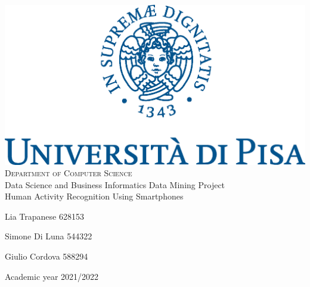 \setlength{\topmargin}{-1cm}
\setlength{\textheight}{240mm}
\setlength{\textwidth}{142mm}
\setlength{\evensidemargin}{0.3in}
\setlength{\oddsidemargin}{0.3in}
\newcommand{\Rom}[1]{\uppercase\expandafter{\romannumeral#1}}
	
\begin{titlepage}
	\begin{center}
		\includegraphics[scale=.5]{FrontespizioDM2/marchio_unipi_pant541.eps} \\\vspace{15pt}
		\LARGE \textsc{Department of Computer Science} \\
		\Large Data Science and Business Informatics
		\vskip 0.7in
		\Large Data Mining \Rom{2} Project \\
		\vskip 1in
		{\fontsize{30}{36}\selectfont Human Activity Recognition Using Smartphones}
		
		\vskip 1in
		
		    
		    {\Large Lia Trapanese 628153}\\
		\par{\Large Simone Di Luna 544322}\\
		\par{\Large Giulio Cordova 588294}  
		
	    \vfill
	
	    \centering
	    \large Academic year 2021/2022
	\end{center}		
\end{titlepage}